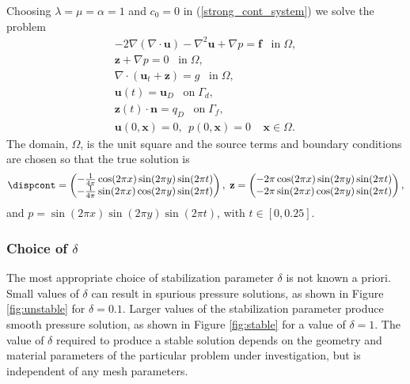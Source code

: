 Choosing $\lambda = \mu =  \alpha = 1$ and $c_0 = 0$ in (\ref{strong_cont_system}) we solve the problem
\begin{subequations}
\begin{align}
-2 \nabla \left( \nabla \cdot \mathbf{u} \right) - \nabla^{2} \mathbf{u} + \nabla p = \mathbf{f} \;\;\; \mbox{in}\; \Omega,\\
{\mathbf{z}} + \nabla p =  0 \;\;\; \mbox{in}\; \Omega,\\
\nabla \cdot (\mathbf{u}_{t} + \mathbf{z} )  = g   \;\;\; \mbox{in}\; \Omega,\\
\mathbf{u}(t) =\mathbf{u}_{D}   \;\;\; \mbox{on}\; \Gamma_{d}, \\
\mathbf{z}(t) \cdot \mathbf{n} = {q_{D}}   \;\;\; \mbox{on}\; \Gamma_{f}, \\
\mathbf{u}(0,\mathbf{x}) = 0, ~~
p(0,\mathbf{x}) = 0 \;\;\;\; \mathbf{x} \in  \Omega.
\end{align}
\label{eqn:simplified_system}
\end{subequations}
The domain, $\Omega$, is the unit square and the source terms and boundary conditions are chosen so that the true solution is  
\begin{equation*}
 \dispcont = \begin{pmatrix}
 -\frac{1}{4 \pi}\cos(2\pi x)\sin(2\pi y)\sin(2\pi t)  \\
 -\frac{1}{4 \pi}\sin(2\pi x)\cos(2\pi y)\sin(2\pi t)
 \end{pmatrix},
\;
 \mathbf{z} =\begin{pmatrix}
 -2\pi\cos(2\pi x)\sin(2\pi y)\sin(2\pi t)  \\
 -2\pi\sin(2\pi x)\cos(2\pi y)\sin(2\pi t)
 \end{pmatrix},
\end{equation*}
and  $p=\sin(2\pi x)\sin(2\pi y)\sin(2\pi t)$, with $t\in[0,0.25]$.


\subsubsection{Choice of $\delta$}
The most appropriate choice of stabilization parameter $\delta$ is not known a priori. Small values of $\delta$ can result in spurious pressure solutions, as shown in Figure \ref{fig:unstable} for $\delta=0.1$. Larger values of the stabilization parameter produce smooth pressure solution, as shown in Figure \ref{fig:stable} for a value of $\delta=1$. The value of $\delta$ required to produce a stable solution depends on the geometry and material parameters of the particular problem under investigation, but is independent of any mesh parameters.

